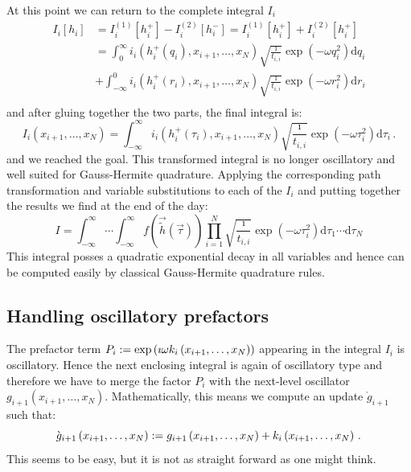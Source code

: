 \documentclass[a4paper,10pt]{article}
\begin{document}
At this point we can return to the complete integral $I_i$
\begin{equation}
\begin{split}
  I_i[h_i] & = I_i^{(1)}[h_i^{+}] - I_i^{(2)}[h_i^{-}] = I_i^{(1)}[h_i^{+}] + I_i^{(2)}[h_i^{+}] \\
  & = \int_0^\infty
    i_i\left(h_i^{+}\left(q_i\right), x_{i+1},\ldots,x_N\right)
    \sqrt{\frac{\imath}{t_{i,i}}}
    \exp\left(- \omega q_i^2\right)
  \mathrm{d}q_i \\
  & +
  \int_{-\infty}^0
    i_i\left(h_i^{+}\left(r_i\right), x_{i+1},\ldots,x_N\right)
    \sqrt{\frac{\imath}{t_{i,i}}}
    \exp\left(- \omega r_i^2\right)
  \mathrm{d}r_i \\
\end{split}
\end{equation}
and after gluing together the two parts, the final integral is:
\begin{equation}
  I_i\left(x_{i+1},\ldots,x_N\right) =
  \int_{-\infty}^\infty
    i_i\left(h_i^{+}\left(\tau_i\right), x_{i+1},\ldots,x_N\right)
    \sqrt{\frac{\imath}{t_{i,i}}}
    \exp\left(- \omega \tau_i^2\right)
  \mathrm{d}\tau_i \,.
\end{equation}
and we reached the goal. This transformed integral is no longer
oscillatory and well suited for Gauss-Hermite quadrature.
Applying the corresponding path transformation and variable substitutions
to each of the $I_i$ and putting together the results we find at the end
of the day:
\begin{equation} \label{eq:transformed_integral}
\boxed{
 I = \int_{-\infty}^\infty \cdots \int_{-\infty}^\infty
       f\left(\vec{\tilde{h}}(\vec{\tau})\right)
       \prod_{i=1}^N \sqrt{\frac{\imath}{t_{i,i}}}
                     \exp\left(-\omega \tau_i^2\right)
    \mathrm{d}\tau_1 \cdots \mathrm{d}\tau_N
}
\end{equation}
This integral posses a quadratic exponential decay in all variables and
hence can be computed easily by classical Gauss-Hermite quadrature
rules.


\subsection{Handling oscillatory prefactors}


The prefactor term $P_i := \exp\left(\imath \omega k_i\left(x_{i+1},\ldots,x_N\right)\right)$
appearing in the integral $I_i$ is oscillatory. Hence the next
enclosing integral is again of oscillatory type and therefore we
have to merge the factor $P_i$ with the next-level oscillator
$g_{i+1}\left(x_{i+1},\ldots,x_N\right)$.
Mathematically, this means we compute an update $\grave{g}_{i+1}$
such that:
\begin{equation} \label{eq:update_equation}
  \grave{g}_{i+1}\left(x_{i+1}, \ldots ,x_N\right)
  := g_{i+1}\left(x_{i+1}, \ldots ,x_N\right)
        + k_i\left(x_{i+1}, \ldots ,x_N\right) \,.
\end{equation}
This seems to be easy, but it is not as straight forward as
one might think.
\end{document}
